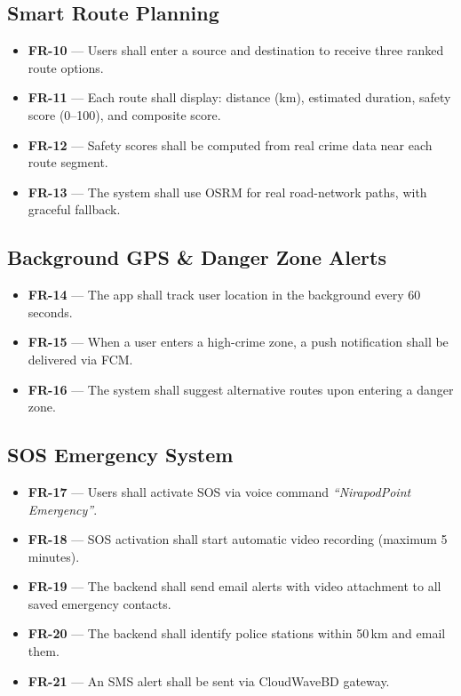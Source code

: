 \documentclass[12pt,a4paper]{report}
\begin{document}
\subsection{Smart Route Planning}
\begin{itemize}[leftmargin=*]
    \item \textbf{FR-10} — Users shall enter a source and destination to receive three ranked route options.
    \item \textbf{FR-11} — Each route shall display: distance (km), estimated duration, safety score (0--100), and composite score.
    \item \textbf{FR-12} — Safety scores shall be computed from real crime data near each route segment.
    \item \textbf{FR-13} — The system shall use OSRM for real road-network paths, with graceful fallback.
\end{itemize}

\subsection{Background GPS \& Danger Zone Alerts}
\begin{itemize}[leftmargin=*]
    \item \textbf{FR-14} — The app shall track user location in the background every 60 seconds.
    \item \textbf{FR-15} — When a user enters a high-crime zone, a push notification shall be delivered via FCM.
    \item \textbf{FR-16} — The system shall suggest alternative routes upon entering a danger zone.
\end{itemize}

\subsection{SOS Emergency System}
\begin{itemize}[leftmargin=*]
    \item \textbf{FR-17} — Users shall activate SOS via voice command \textit{``NirapodPoint Emergency''}.
    \item \textbf{FR-18} — SOS activation shall start automatic video recording (maximum 5 minutes).
    \item \textbf{FR-19} — The backend shall send email alerts with video attachment to all saved emergency contacts.
    \item \textbf{FR-20} — The backend shall identify police stations within 50\,km and email them.
    \item \textbf{FR-21} — An SMS alert shall be sent via CloudWaveBD gateway.
\end{itemize}
\end{document}
